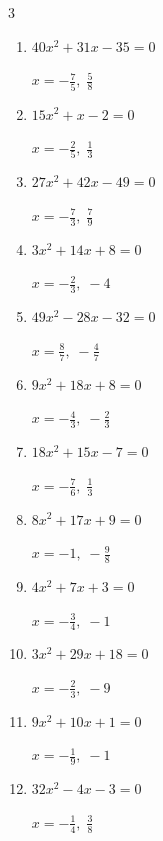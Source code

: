 \begin{multicols}{3}
\begin{enumerate}
        $\displaystyle x=-\frac{2}{7},\; -\frac{3}{2}$

  \item $40x^{2}+31x-35=0$

        $\displaystyle x=-\frac{7}{5},\; \frac{5}{8}$

\columnbreak %

  \item $15x^{2}+x-2=0$

        $\displaystyle x=-\frac{2}{5},\; \frac{1}{3}$

  \item $27x^{2}+42x-49=0$

        $\displaystyle x=-\frac{7}{3},\; \frac{7}{9}$

  \item $3x^{2}+14x+8=0$

        $\displaystyle x=-\frac{2}{3},\; -4$

  \item $49x^{2}-28x-32=0$

        $\displaystyle x=\frac{8}{7},\; -\frac{4}{7}$

  \item $9x^{2}+18x+8=0$

        $\displaystyle x=-\frac{4}{3},\; -\frac{2}{3}$

  \item $18x^{2}+15x-7=0$

        $\displaystyle x=-\frac{7}{6},\; \frac{1}{3}$

  \item $8x^{2}+17x+9=0$

        $\displaystyle x=-1,\; -\frac{9}{8}$

  \item $4x^{2}+7x+3=0$

        $\displaystyle x=-\frac{3}{4},\; -1$

  \item $3x^{2}+29x+18=0$

        $\displaystyle x=-\frac{2}{3},\; -9$

  \item $9x^{2}+10x+1=0$

        $\displaystyle x=-\frac{1}{9},\; -1$

\columnbreak %

\resetques

  \item $32x^{2}-4x-3=0$

        $\displaystyle x=-\frac{1}{4},\; \frac{3}{8}$


\end{enumerate}
\end{multicols}
